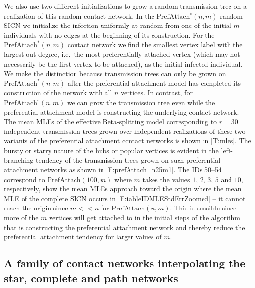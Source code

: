\documentclass[review]{elsarticle}
\numberwithin{equation}{section}
\let\orgautoref\autoref
\renewcommand{\autoref}
        {\def\equationautorefname{Eq.}%
         \def\figureautorefname{Fig.}%
         \def\subfigureautorefname{Fig.}%
         \def\sectionautorefname{Sect.}%
         \def\subsectionautorefname{Sect.}%
         \def\subsubsectionautorefname{Sect.}%
         \def\Itemautorefname{item}%
         \def\tableautorefname{Table}%
         \def\propositionautorefname{Prop.}%
         \def\corollaryautorefname{Corollary}%
         \def\theoremautorefname{Theorem}%
         \def\remarkautorefname{Remark}%
         \def\lemmaautorefname{Lemma}%
         \def\proofofautorefname{Proof}%
         \def\exampleautorefname{Example}%
         \orgautoref}
\begin{document}
We also use two different initializations to grow a random transmission tree on a realization of this random contact network.  
In the $\mathrm{PrefAttach}^{\circ}(n,m)$ random SICN we initialize the infection uniformly at random from one of the initial $m$ individuals with no edges at the beginning of its construction.  
For the $\mathrm{PrefAttach}^*(n,m)$ contact network we find the smallest vertex label with the largest out-degree, i.e.~the most preferentially attached vertex (which may not necessarily be the first vertex to be attached), as the initial infected individual.  
We make the distinction because transmission trees can only be grown on $\mathrm{PrefAttach}^*(n,m)$ after the preferential attachment model has completed its construction of the network with all $n$ vertices.  
In contrast, for $\mathrm{PrefAttach}^{\circ}(n,m)$ we can grow the transmission tree even while the preferential attachment model is constructing the underlying contact network. 
The mean MLEs of the effective Beta-splitting model corresponding to $r=30$ independent transmission trees grown over independent realizations of these two variants of the preferential attachment contact networks is shown in \autoref{T:mles}.  
The bursty or starry nature of the hubs or popular vertices is evident in the left-branching tendency of the transmission trees grown on such preferential attachment networks as shown in \autoref{F:prefAttach_n25m1}.  
The IDs 50--54 correspond to $\mathrm{PrefAttach}(100,m)$ where $m$ takes the values $1$, $2$, $3$, $5$ and $10$, respectively, show the mean MLEs approach toward the origin where the mean MLE of the complete SICN occurs in \autoref{F:tableIDMLEStdErrZoomed} -- it cannot reach the origin since $m << n$ for $\mathrm{PrefAttach}(n,m)$.  
This is sensible since more of the $m$ vertices will get attached to in the initial steps of the algorithm that is constructing the preferential attachment network and thereby reduce the preferential attachment tendency for larger values of $m$. 

\subsection{A family of contact networks interpolating the star, complete and path networks}
\end{document}
